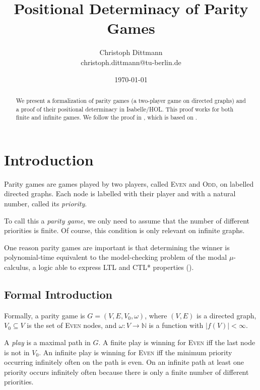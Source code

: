 \documentclass[11pt,a4paper]{scrartcl}
\newcommand{\Even}{\textsc{Even}\xspace}
\newcommand{\Odd}{\textsc{Odd}\xspace}
\begin{document}
\title{Positional Determinacy of Parity Games}
\author{Christoph Dittmann\\christoph.dittmann@tu-berlin.de}
\date{\today}
\maketitle

\begin{abstract}
  We present a formalization of parity games (a two-player game on
  directed graphs) and a proof of their positional determinacy in
  Isabelle/HOL.  This proof works for both finite and infinite games.
  We follow the proof in \cite{kreutzer2015}, which is based on
  \cite{zielonka1998}.
\end{abstract}

\tableofcontents
\newpage

\section{Introduction}

Parity games are games played by two players, called \Even and \Odd,
on labelled directed graphs.  Each node is labelled with their player
and with a natural number, called its \emph{priority}.

To call this a \emph{parity game}, we only need to assume that the
number of different priorities is finite.  Of course, this condition
is only relevant on infinite graphs.

One reason parity games are important is that determining the winner
is polynomial-time equivalent to the model-checking problem of the
modal $\mu$-calculus, a logic able to express LTL and CTL* properties
(\cite{bradfield2007}).

\subsection{Formal Introduction}

Formally, a parity game is $G = (V,E,V_0,\omega)$, where $(V,E)$ is a
directed graph, $V_0 \subseteq V$ is the set of \Even nodes, and
$\omega: V \to \mathbb{N}$ is a function with $|f(V)| < \infty$.

A \emph{play} is a maximal path in $G$.  A finite play is winning for
\Even iff the last node is not in $V_0$.  An infinite play is winning
for \Even iff the minimum priority occurring infinitely often on the
path is even.  On an infinite path at least one priority occurs
infinitely often because there is only a finite number of different
priorities.
\end{document}
